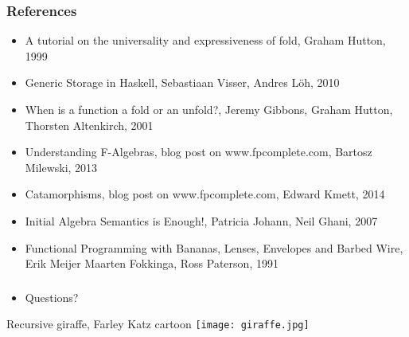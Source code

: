 \documentclass[10pt]{beamer}
\begin{document}
\begin{frame}[fragile]
\frametitle{References}

\begin{itemize}
\item A tutorial on the universality and expressiveness of fold, Graham Hutton, 1999
\item Generic Storage in Haskell, Sebastiaan Visser, Andres Löh, 2010
\item When is a function a fold or an unfold?, Jeremy Gibbons, Graham Hutton, Thorsten Altenkirch, 2001
\item Understanding F-Algebras, blog post on www.fpcomplete.com, Bartosz Milewski, 2013
\item Catamorphisms, blog post on www.fpcomplete.com, Edward Kmett, 2014
\item Initial Algebra Semantics is Enough!, Patricia Johann, Neil Ghani, 2007
\item Functional Programming with Bananas, Lenses, Envelopes and Barbed Wire, Erik Meijer Maarten Fokkinga, Ross Paterson, 1991
\end{itemize}

\end{frame}




\begin{frame}[fragile]
\frametitle{}

\begin{itemize}
\item Questions?
\end{itemize}

\begin{block}{Recursive giraffe, Farley Katz cartoon }
\texttt{[image: giraffe.jpg]}	
\end{block}
\end{frame}
\end{document}
